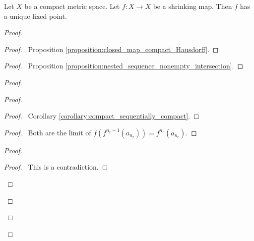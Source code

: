 \begin{proposition}
    Let $X$ be a compact metric space. Let $f : X \rightarrow X$ be a shrinking map.
    Then $f$ has a unique fixed point.
\end{proposition}

\begin{proof}
    \pf
    \begin{proof}
        \pf\ Proposition \ref{proposition:closed_map_compact_Hausdorff}.
    \end{proof}
    \begin{proof}
        \pf\ Proposition \ref{proposition:nested_sequence_nonempty_intersection}.
    \end{proof}
    \begin{proof}
        \begin{proof}
            \begin{proof}
                \pf\ Corollary \ref{corollary:compact_sequentially_compact}.
            \end{proof}
            \begin{proof}
                \pf\ Both are the limit of $f(f^{n_r-1}(a_{n_r})) = f^{n_r}(a_{n_r})$.
            \end{proof}
            \begin{proof}
                \qedstep
                \begin{proof}
                    \pf\ This is a contradiction.
                \end{proof}
            \end{proof}
        \end{proof}
    \end{proof}

\end{proof}
